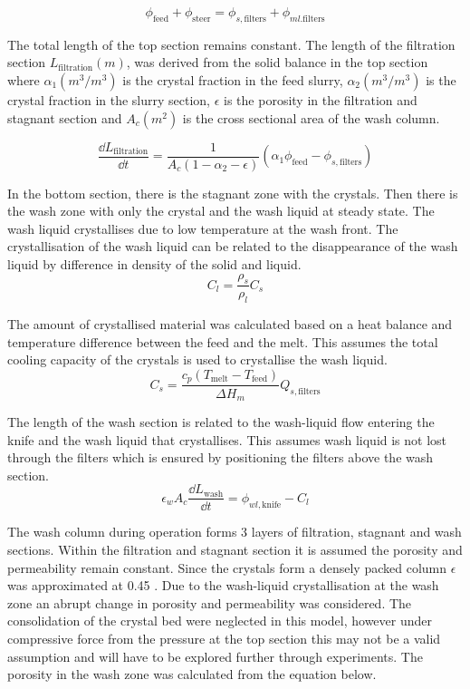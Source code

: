 \begin{equation}
\phi_{\mathrm{feed}}+\phi_{\mathrm{steer}}=\phi_{s,\mathrm{filters}}+\phi_{ml.\mathrm{filters}}
\end{equation}

The total length of the top section remains constant. The length of the filtration section $ L_{\mathrm{filtration}} (m)$,  was derived from the solid balance in the top section where $\alpha_1 (m^3/m^3)$ is the crystal fraction in the feed slurry, $\alpha_2 (m^3/m^3)$ is the crystal fraction in the slurry section, $\epsilon$ is the porosity in the filtration and stagnant section and $A_c (m^2)$ is the cross sectional area of the wash column. 

\begin{equation}
\frac{\dd L_{\mathrm{filtration}}}{\dd t} = \frac{1}{A_c(1-\alpha_2-\epsilon)}(\alpha_1\phi_{\mathrm{feed}}-\phi_{s,\mathrm{filters}})
\end{equation}

In the bottom section, there is the stagnant zone with the crystals. Then there is the wash zone with only the crystal and the wash liquid at steady state. The wash liquid crystallises due to low temperature at the wash front. The crystallisation of the wash liquid can be related to the disappearance of the wash liquid by difference in density of the solid and liquid.
\begin{equation}
C_l= \frac{\rho_s}{\rho_l}C_s
\end{equation}

The amount of crystallised material was calculated based on a heat balance and temperature difference between the feed and the melt. This assumes the total cooling capacity of the crystals is used to crystallise the wash liquid. 
\begin{equation}
C_s= \frac{c_p(T_{\mathrm{melt}}-T_{\mathrm{feed}})}{\Delta H_m}Q_{s,\mathrm{filters}}
\end{equation}

The length of the wash section is related to the wash-liquid flow entering the knife and the wash liquid that crystallises. This assumes wash liquid is not lost through the filters which is ensured by positioning the filters above the wash section.
\begin{equation}
\epsilon_w A_c \frac{\dd L_{\mathrm{wash}}}{\dd t}= \phi_{wl,\mathrm{knife}}-C_l
\end{equation}

The wash column during operation forms 3 layers of filtration, stagnant and wash sections. Within the filtration and stagnant section it is assumed the porosity and permeability remain constant. Since the crystals form a densely packed column $\epsilon$ was approximated at 0.45 \cite{jansens_furification_1995}. Due to the wash-liquid crystallisation at the wash zone an abrupt change in porosity and permeability was considered. The consolidation of the crystal bed were neglected in this model, however under compressive force from the pressure at the top section this may not be a valid assumption and will have to be explored further through experiments. The porosity in the wash zone was calculated from the equation below. 

